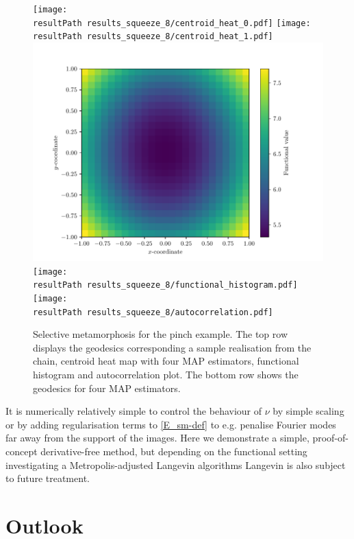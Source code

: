 \documentclass[runningheads]{llncs}
\begin{document}
\begin{figure}
\centering
\begin{minipage}{\textwidth}
  \centering
    \texttt{[image: \\resultPath
    results\_squeeze\_8/centroid\_heat\_0.pdf]}
    \texttt{[image: \\resultPath
    results\_squeeze\_8/centroid\_heat\_1.pdf]}
    \includegraphics[width=.23\textwidth]{density_squeeze.pdf}\\[0.23cm]
    \texttt{[image: \\resultPath results\_squeeze\_8/functional\_histogram.pdf]}
    \texttt{[image: \\resultPath results\_squeeze\_8/autocorrelation.pdf]}
    \caption{Selective metamorphosis for the pinch example. The top row displays
    the geodesics corresponding a sample realisation from the chain, centroid
    heat map with four MAP estimators, functional histogram and autocorrelation
    plot. The bottom row shows the geodesics for four MAP estimators.}
    \label{fig:selective:pinch}
\end{minipage}
\end{figure}

It is numerically relatively simple to control the behaviour of $\nu$ by simple
scaling or by adding regularisation terms to \eqref{E_sm-def} to e.g. penalise
Fourier modes far away from the support of the images. Here we demonstrate a
simple, proof-of-concept derivative-free method, but depending on the functional
setting investigating a Metropolis-adjusted Langevin algorithms Langevin is also
subject to future treatment.

\section{Outlook}\label{sec:outlook}
\end{document}
